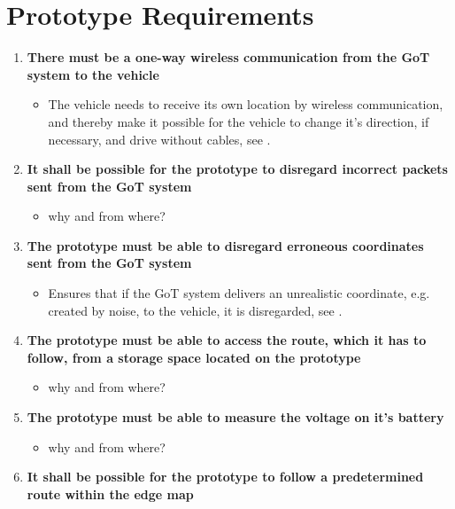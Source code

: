 \chapter{Prototype Requirements} \label{Requirements}

\begin{enumerate}
\item \textbf{There must be a one-way wireless communication from the GoT system to the vehicle}
	\begin{itemize}
	\item[] The vehicle needs to receive its own location by wireless communication, and thereby make it possible for the vehicle to change it's direction, if necessary, and drive without cables, see .
	\end{itemize}
\item \textbf{It shall be possible for the prototype to disregard incorrect packets sent from the GoT system}
	\begin{itemize}
	\item[] why and from where?
	\end{itemize}
	\item \textbf{The prototype must be able to disregard erroneous coordinates sent from the GoT system}
	\begin{itemize}
	\item[] Ensures that if the GoT system delivers an unrealistic coordinate, e.g. created by noise, to the vehicle, it is disregarded, see .
	\end{itemize}
\item \textbf{The prototype must be able to access the route, which it has to follow, from a storage space located on the prototype}
	\begin{itemize}
	\item[] why and from where?
	\end{itemize}
\item \textbf{The prototype must be able to measure the voltage on it's battery}
	\begin{itemize}
	\item[] why and from where?
	\end{itemize}
\item \textbf{It shall be possible for the prototype to follow a predetermined route within the edge map}

\end{enumerate}
